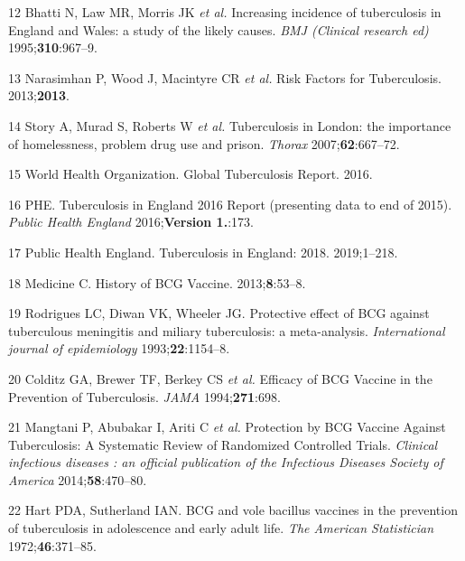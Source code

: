 \documentclass[11pt,twoside]{bristolthesis}
\begin{document}
  \leavevmode\hypertarget{ref-Bhatti1995}{}%
  12 Bhatti N, Law MR, Morris JK \emph{et al.} Increasing incidence of tuberculosis in England and Wales: a study of the likely causes. \emph{BMJ (Clinical research ed)} 1995;\textbf{310}:967--9.
  
  \leavevmode\hypertarget{ref-Narasimhan2013}{}%
  13 Narasimhan P, Wood J, Macintyre CR \emph{et al.} Risk Factors for Tuberculosis. 2013;\textbf{2013}.
  
  \leavevmode\hypertarget{ref-Story2007}{}%
  14 Story A, Murad S, Roberts W \emph{et al.} Tuberculosis in London: the importance of homelessness, problem drug use and prison. \emph{Thorax} 2007;\textbf{62}:667--72.
  
  \leavevmode\hypertarget{ref-WHOTB2016}{}%
  15 World Health Organization. Global Tuberculosis Report. 2016.
  
  \leavevmode\hypertarget{ref-PHE2016a}{}%
  16 PHE. Tuberculosis in England 2016 Report (presenting data to end of 2015). \emph{Public Health England} 2016;\textbf{Version 1.}:173.
  
  \leavevmode\hypertarget{ref-PHE2018}{}%
  17 Public Health England. Tuberculosis in England: 2018. 2019;1--218.
  
  \leavevmode\hypertarget{ref-Medicine2013}{}%
  18 Medicine C. History of BCG Vaccine. 2013;\textbf{8}:53--8.
  
  \leavevmode\hypertarget{ref-Rodrigues1993}{}%
  19 Rodrigues LC, Diwan VK, Wheeler JG. Protective effect of BCG against tuberculous meningitis and miliary tuberculosis: a meta-analysis. \emph{International journal of epidemiology} 1993;\textbf{22}:1154--8.
  
  \leavevmode\hypertarget{ref-Colditz1994}{}%
  20 Colditz GA, Brewer TF, Berkey CS \emph{et al.} Efficacy of BCG Vaccine in the Prevention of Tuberculosis. \emph{JAMA} 1994;\textbf{271}:698.
  
  \leavevmode\hypertarget{ref-Mangtani2014a}{}%
  21 Mangtani P, Abubakar I, Ariti C \emph{et al.} Protection by BCG Vaccine Against Tuberculosis: A Systematic Review of Randomized Controlled Trials. \emph{Clinical infectious diseases : an official publication of the Infectious Diseases Society of America} 2014;\textbf{58}:470--80.
  
  \leavevmode\hypertarget{ref-Hart1972}{}%
  22 Hart PDA, Sutherland IAN. BCG and vole bacillus vaccines in the prevention of tuberculosis in adolescence and early adult life. \emph{The American Statistician} 1972;\textbf{46}:371--85.
  
\end{document}
